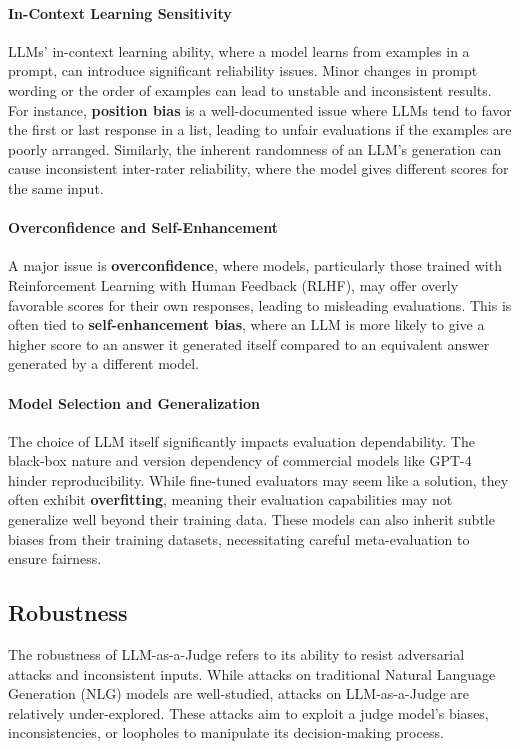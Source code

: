 \documentclass[acmsmall,screen]{acmart}
\begin{document}
\paragraph{\textbf{In-Context Learning Sensitivity}}
LLMs' in-context learning ability, where a model learns from examples in a prompt, can introduce significant reliability issues. Minor changes in prompt wording or the order of examples can lead to unstable and inconsistent results. For instance, \textbf{position bias} is a well-documented issue where LLMs tend to favor the first or last response in a list, leading to unfair evaluations if the examples are poorly arranged. Similarly, the inherent randomness of an LLM's generation can cause inconsistent inter-rater reliability, where the model gives different scores for the same input.

\paragraph{\textbf{Overconfidence and Self-Enhancement}}
A major issue is \textbf{overconfidence}, where models, particularly those trained with Reinforcement Learning with Human Feedback (RLHF), may offer overly favorable scores for their own responses, leading to misleading evaluations. This is often tied to \textbf{self-enhancement bias}, where an LLM is more likely to give a higher score to an answer it generated itself compared to an equivalent answer generated by a different model.

\paragraph{\textbf{Model Selection and Generalization}}
The choice of LLM itself significantly impacts evaluation dependability. The black-box nature and version dependency of commercial models like GPT-4 hinder reproducibility. While fine-tuned evaluators may seem like a solution, they often exhibit \textbf{overfitting}, meaning their evaluation capabilities may not generalize well beyond their training data. These models can also inherit subtle biases from their training datasets, necessitating careful meta-evaluation to ensure fairness.

\subsection{Robustness}
The robustness of LLM-as-a-Judge refers to its ability to resist adversarial attacks and inconsistent inputs. While attacks on traditional Natural Language Generation (NLG) models are well-studied, attacks on LLM-as-a-Judge are relatively under-explored. These attacks aim to exploit a judge model's biases, inconsistencies, or loopholes to manipulate its decision-making process.
\end{document}
